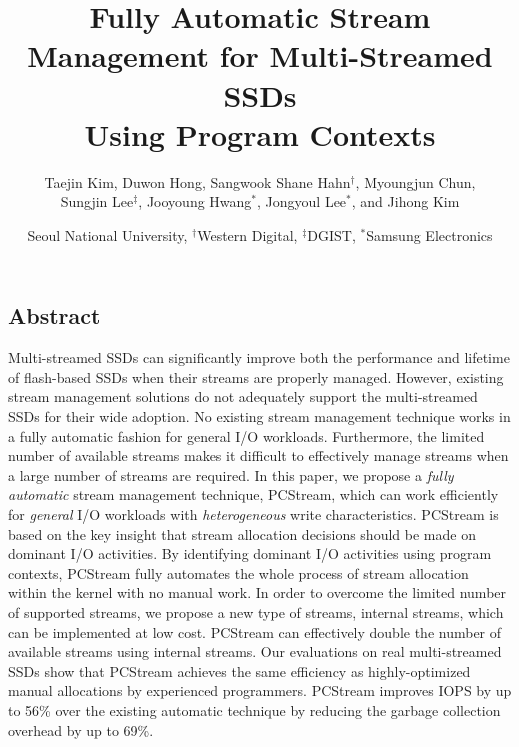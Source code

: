 \documentclass[letterpaper, twocolumn, 10pt]{article}
\begin{document}
\title{
\bf Fully Automatic Stream Management for Multi-Streamed SSDs \\ Using Program Contexts}


\author{
	{\rm Taejin Kim, Duwon Hong, Sangwook Shane Hahn$^\dagger$, Myoungjun Chun,}\\ 
	{\rm Sungjin Lee$^\ddagger$, Jooyoung Hwang$^\ast$, Jongyoul Lee$^\ast$, and Jihong Kim} \\
	\and
	Seoul National University, $^\dagger$Western Digital, $^\ddagger$DGIST, $^\ast$Samsung Electronics
}



%


\maketitle
\pagestyle{empty}
\subsection*{Abstract}
\vspace{-6pt}
Multi-streamed SSDs can significantly improve both the performance and lifetime
of flash-based SSDs when their streams are properly managed.  However, existing
stream management solutions do not adequately support the multi-streamed SSDs
for their wide adoption.  No existing stream management technique works in a
fully automatic fashion for general I/O workloads.
Furthermore, the limited number of available streams makes it
difficult to effectively manage streams when a large number of streams are
required.  In this paper, we propose a {\it fully automatic} stream management
technique, \textsf{\small PCStream}, which can work efficiently for {\it
general} I/O workloads with {\it heterogeneous} write characteristics.  
\textsf{\small PCStream} is based on the key insight
that stream allocation decisions should be made on dominant I/O activities. By
identifying dominant I/O activities using program contexts, \textsf{\small
PCStream} fully automates the whole process of stream allocation within the
kernel with no manual work.  In order to overcome the limited number of
supported streams, we propose a new type of streams, internal streams, which
can be implemented at low cost.  \textsf{\small PCStream} can effectively
double the number of available streams using internal streams.  Our evaluations
on real multi-streamed SSDs show that \textsf{\small PCStream} achieves the
same efficiency as highly-optimized manual allocations by experienced
programmers.  \textsf{\small PCStream} improves IOPS by up to 56\% over the
existing automatic technique by reducing the garbage collection overhead by up
to 69\%.
\end{document}
